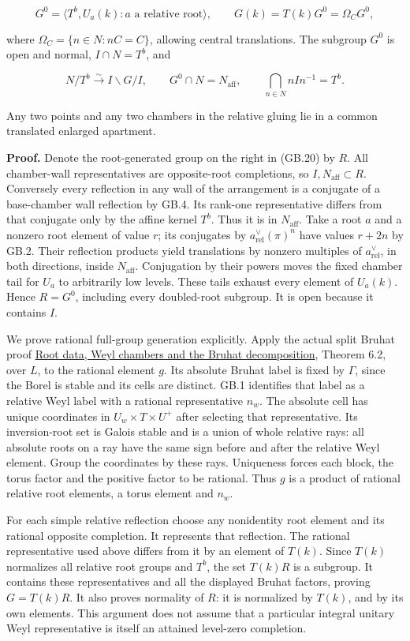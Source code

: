\documentclass[
  11pt,
]{article}
\begin{document}
\[
 G^0=\langle T^b,U_a(k):a\text{ a relative root}\rangle,
 \qquad G(k)=T(k)G^0=\Omega_CG^0,
 \tag{GB.20}
\]

where \(\Omega_C=\{n\in N:nC=C\}\), allowing central translations. The
subgroup \(G^0\) is open and normal, \(I\cap N=T^b\), and

\[
 N/T^b\xrightarrow{\sim}I\backslash G/I,\qquad
 G^0\cap N=N_{\mathrm{aff}},\qquad
 \bigcap_{n\in N}nIn^{-1}=T^b.
 \tag{GB.21}
\]

Any two points and any two chambers in the relative gluing lie in a
common translated enlarged apartment.

\textbf{Proof.} Denote the root-generated group on the right in (GB.20)
by \(R\). All chamber-wall representatives are opposite-root
completions, so \(I,N_{\mathrm{aff}}\subset R\). Conversely every
reflection in any wall of the arrangement is a conjugate of a
base-chamber wall reflection by GB.4. Its rank-one representative
differs from that conjugate only by the affine kernel \(T^b\). Thus it
is in \(N_{\mathrm{aff}}\). Take a root \(a\) and a nonzero root element
of value \(r\); its conjugates by \(a^\vee_{\mathrm{rel}}(\pi)^n\) have
values \(r+2n\) by GB.2. Their reflection products yield translations by
nonzero multiples of \(a^\vee_{\mathrm{rel}}\), in both directions,
inside \(N_{\mathrm{aff}}\). Conjugation by their powers moves the fixed
chamber tail for \(U_a\) to arbitrarily low levels. These tails exhaust
every element of \(U_a(k)\). Hence \(R=G^0\), including every
doubled-root subgroup. It is open because it contains \(I\).

We prove rational full-group generation explicitly. Apply the actual
split Bruhat proof \href{../AG-RG/AG-RG-04.html}{Root data, Weyl
chambers and the Bruhat decomposition}, Theorem 6.2, over \(L\), to the
rational element \(g\). Its absolute Bruhat label is fixed by
\(\Gamma\), since the Borel is stable and its cells are distinct. GB.1
identifies that label as a relative Weyl label with a rational
representative \(n_w\). The absolute cell has unique coordinates in
\(U_w\times T\times U^+\) after selecting that representative. Its
inversion-root set is Galois stable and is a union of whole relative
rays: all absolute roots on a ray have the same sign before and after
the relative Weyl element. Group the coordinates by these rays.
Uniqueness forces each block, the torus factor and the positive factor
to be rational. Thus \(g\) is a product of rational relative root
elements, a torus element and \(n_w\).

For each simple relative reflection choose any nonidentity root element
and its rational opposite completion. It represents that reflection. The
rational representative used above differs from it by an element of
\(T(k)\). Since \(T(k)\) normalizes all relative root groups and
\(T^b\), the set \(T(k)R\) is a subgroup. It contains these
representatives and all the displayed Bruhat factors, proving
\(G=T(k)R\). It also proves normality of \(R\): it is normalized by
\(T(k)\), and by its own elements. This argument does not assume that a
particular integral unitary Weyl representative is itself an attained
level-zero completion.
\end{document}
